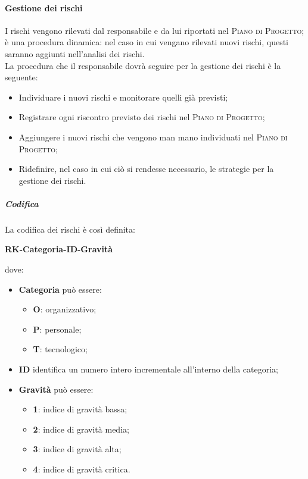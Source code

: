 \documentclass[../norme-di-progetto.tex]{subfiles}
\begin{document}
\paragraph{Gestione dei rischi}
I rischi vengono rilevati dal responsabile e da lui riportati nel \textsc{Piano di Progetto}; è una procedura dinamica: nel caso in cui vengano rilevati nuovi rischi, questi saranno aggiunti nell'analisi dei rischi. \\
La procedura che il responsabile dovrà seguire per la gestione dei rischi è la seguente:
\begin{itemize}
  \item Individuare i nuovi rischi e monitorare quelli già previsti;
  \item Registrare ogni riscontro previsto dei rischi nel \textsc{Piano di Progetto};
  \item Aggiungere i nuovi rischi che vengono man mano individuati nel \textsc{Piano di Progetto};
  \item Ridefinire, nel caso in cui ciò si rendesse necessario, le strategie per la gestione dei rischi.
\end{itemize}
\subparagraph*{Codifica}
La codifica dei rischi è così definita: \\
\begin{center}
\centering
\textbf{RK-Categoria-ID-Gravità}
\end{center} dove:
\begin{itemize}
  \item \textbf{Categoria} può essere:
  \begin{itemize}
    \item \textbf{O}: organizzativo;
    \item \textbf{P}: personale;
    \item \textbf{T}: tecnologico;
  \end{itemize}
  \item \textbf{ID} identifica un numero intero incrementale all'interno della categoria;
  \item \textbf{Gravità} può essere:
  \begin{itemize}
    \item \textbf{1}: indice di gravità bassa;
    \item \textbf{2}: indice di gravità media;
    \item \textbf{3}: indice di gravità alta;
    \item \textbf{4}: indice di gravità critica.
  \end{itemize}
\end{itemize}
\end{document}
